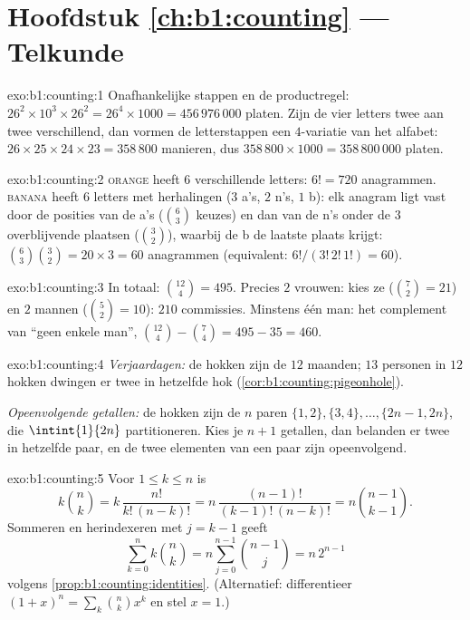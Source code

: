 \section*{Hoofdstuk \ref{ch:b1:counting} --- Telkunde}

\begin{solution}{exo:b1:counting:1}
Onafhankelijke stappen en de productregel: $26^2 \times 10^3 \times 26^2
= 26^4 \times 1000 = 456\,976\,000$ platen. Zijn de vier letters twee aan
twee verschillend, dan vormen de letterstappen een $4$-variatie van het
alfabet: $26 \times 25 \times 24 \times 23 = 358\,800$ manieren, dus
$358\,800 \times 1000 = 358\,800\,000$ platen.
\end{solution}

\begin{solution}{exo:b1:counting:2}
\textsc{orange} heeft $6$ verschillende letters: $6! = 720$ anagrammen.
\textsc{banana} heeft $6$ letters met herhalingen ($3$ a's, $2$ n's,
$1$ b): elk anagram ligt vast door de posities van de a's ($\binom 63$
keuzes) en dan van de n's onder de $3$ overblijvende plaatsen ($\binom
32$), waarbij de b de laatste plaats krijgt:
$\binom{6}{3}\binom{3}{2} = 20 \times 3 = 60$ anagrammen (equivalent:
$6!/(3!\,2!\,1!) = 60$).
\end{solution}

\begin{solution}{exo:b1:counting:3}
In totaal: $\binom{12}{4} = 495$. Precies $2$ vrouwen: kies ze
($\binom 72 = 21$) en $2$ mannen ($\binom 52 = 10$): $210$ commissies.
Minstens één man: het complement van ``geen enkele man'',
$\binom{12}{4} - \binom{7}{4} = 495 - 35 = 460$.
\end{solution}

\begin{solution}{exo:b1:counting:4}
\emph{Verjaardagen:} de hokken zijn de $12$ maanden; $13$ personen in
$12$ hokken dwingen er twee in hetzelfde hok
(\cref{cor:b1:counting:pigeonhole}).

\emph{Opeenvolgende getallen:} de hokken zijn de $n$ paren $\{1,2\},
\{3,4\}, \dots, \{2n-1, 2n\}$, die $\intint{1}{2n}$ partitioneren. Kies
je $n + 1$ getallen, dan belanden er twee in hetzelfde paar, en de twee
elementen van een paar zijn opeenvolgend.
\end{solution}

\begin{solution}{exo:b1:counting:5}
Voor $1 \leq k \leq n$ is
\[
k \binom nk = k\,\frac{n!}{k!\,(n-k)!}
= n\,\frac{(n-1)!}{(k-1)!\,(n-k)!} = n \binom{n-1}{k-1}.
\]
Sommeren en herindexeren met $j = k - 1$ geeft
\[
\sum_{k=0}^{n} k \binom nk = n \sum_{j=0}^{n-1} \binom{n-1}{j}
= n\, 2^{n-1}
\]
volgens \cref{prop:b1:counting:identities}. (Alternatief: differentieer
$(1+x)^n = \sum_k \binom nk x^k$ en stel $x = 1$.)
\end{solution}

